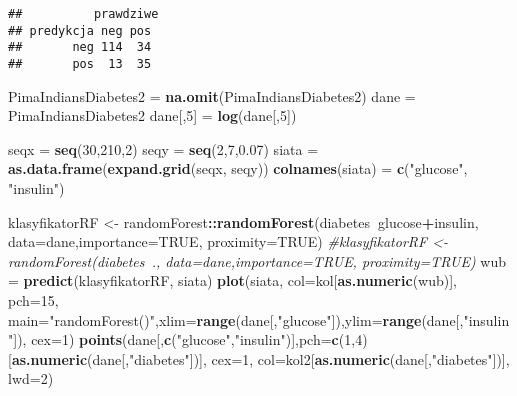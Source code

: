 \documentclass[polish,]{book}
\newenvironment{Shaded}{\begin{snugshade}}{\end{snugshade}}
\newcommand{\CommentTok}[1]{\textcolor[rgb]{0.56,0.35,0.01}{\textit{#1}}}
\newcommand{\DataTypeTok}[1]{\textcolor[rgb]{0.13,0.29,0.53}{#1}}
\newcommand{\DecValTok}[1]{\textcolor[rgb]{0.00,0.00,0.81}{#1}}
\newcommand{\FloatTok}[1]{\textcolor[rgb]{0.00,0.00,0.81}{#1}}
\newcommand{\KeywordTok}[1]{\textcolor[rgb]{0.13,0.29,0.53}{\textbf{#1}}}
\newcommand{\NormalTok}[1]{#1}
\newcommand{\OperatorTok}[1]{\textcolor[rgb]{0.81,0.36,0.00}{\textbf{#1}}}
\newcommand{\OtherTok}[1]{\textcolor[rgb]{0.56,0.35,0.01}{#1}}
\newcommand{\StringTok}[1]{\textcolor[rgb]{0.31,0.60,0.02}{#1}}
\begin{document}
\begin{verbatim}
##          prawdziwe
## predykcja neg pos
##       neg 114  34
##       pos  13  35
\end{verbatim}

\begin{Shaded}
\begin{Highlighting}[]
\NormalTok{PimaIndiansDiabetes2 =}\StringTok{ }\KeywordTok{na.omit}\NormalTok{(PimaIndiansDiabetes2)}
\NormalTok{dane =}\StringTok{ }\NormalTok{PimaIndiansDiabetes2}
\NormalTok{dane[,}\DecValTok{5}\NormalTok{] =}\StringTok{ }\KeywordTok{log}\NormalTok{(dane[,}\DecValTok{5}\NormalTok{])}

\NormalTok{seqx =}\StringTok{ }\KeywordTok{seq}\NormalTok{(}\DecValTok{30}\NormalTok{,}\DecValTok{210}\NormalTok{,}\DecValTok{2}\NormalTok{)}
\NormalTok{seqy =}\StringTok{ }\KeywordTok{seq}\NormalTok{(}\DecValTok{2}\NormalTok{,}\DecValTok{7}\NormalTok{,}\FloatTok{0.07}\NormalTok{)}
\NormalTok{siata =}\StringTok{ }\KeywordTok{as.data.frame}\NormalTok{(}\KeywordTok{expand.grid}\NormalTok{(seqx, seqy))}
\KeywordTok{colnames}\NormalTok{(siata) =}\StringTok{ }\KeywordTok{c}\NormalTok{(}\StringTok{"glucose"}\NormalTok{, }\StringTok{"insulin"}\NormalTok{)}

\NormalTok{klasyfikatorRF <-}\StringTok{ }\NormalTok{randomForest}\OperatorTok{::}\KeywordTok{randomForest}\NormalTok{(diabetes}\OperatorTok{~}\NormalTok{glucose}\OperatorTok{+}\NormalTok{insulin,}
                                             \DataTypeTok{data=}\NormalTok{dane,}\DataTypeTok{importance=}\OtherTok{TRUE}\NormalTok{, }\DataTypeTok{proximity=}\OtherTok{TRUE}\NormalTok{)}
\CommentTok{#klasyfikatorRF <- randomForest(diabetes~., data=dane,importance=TRUE, proximity=TRUE)}
\NormalTok{wub =}\StringTok{ }\KeywordTok{predict}\NormalTok{(klasyfikatorRF, siata)}
\KeywordTok{plot}\NormalTok{(siata, }\DataTypeTok{col=}\NormalTok{kol[}\KeywordTok{as.numeric}\NormalTok{(wub)], }\DataTypeTok{pch=}\DecValTok{15}\NormalTok{, }
     \DataTypeTok{main=}\StringTok{"randomForest()"}\NormalTok{,}\DataTypeTok{xlim=}\KeywordTok{range}\NormalTok{(dane[,}\StringTok{"glucose"}\NormalTok{]),}\DataTypeTok{ylim=}\KeywordTok{range}\NormalTok{(dane[,}\StringTok{"insulin"}\NormalTok{]),}
     \DataTypeTok{cex=}\DecValTok{1}\NormalTok{)}
\KeywordTok{points}\NormalTok{(dane[,}\KeywordTok{c}\NormalTok{(}\StringTok{"glucose"}\NormalTok{,}\StringTok{"insulin"}\NormalTok{)],}\DataTypeTok{pch=}\KeywordTok{c}\NormalTok{(}\DecValTok{1}\NormalTok{,}\DecValTok{4}\NormalTok{)[}\KeywordTok{as.numeric}\NormalTok{(dane[,}\StringTok{"diabetes"}\NormalTok{])], }
       \DataTypeTok{cex=}\DecValTok{1}\NormalTok{, }\DataTypeTok{col=}\NormalTok{kol2[}\KeywordTok{as.numeric}\NormalTok{(dane[,}\StringTok{"diabetes"}\NormalTok{])], }\DataTypeTok{lwd=}\DecValTok{2}\NormalTok{)}
\end{Highlighting}
\end{Shaded}
\end{document}
